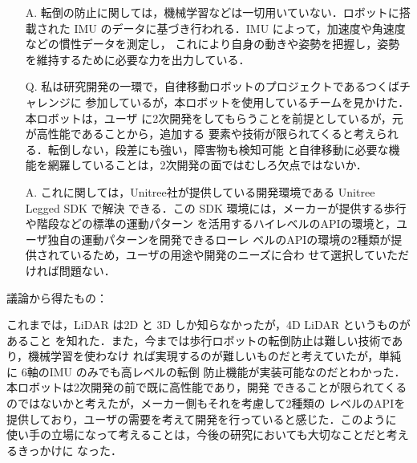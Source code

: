 \documentclass{jsarticle}
\begin{document}
\begin{itemize}
  \item [A.]転倒の防止に関しては，機械学習などは一切用いていない．ロボットに搭載された IMU
  \hspace*{5.5zw}のデータに基づき行われる．IMU によって，加速度や角速度などの慣性データを測定し，
  \hspace*{5.5zw}これにより自身の動きや姿勢を把握し，姿勢を維持するために必要な力を出力している．\\
  \vspace*{1zh}

  \item [Q.]私は研究開発の一環で，自律移動ロボットのプロジェクトであるつくばチャレンジに
  \hspace*{5.5zw}参加しているが，本ロボットを使用しているチームを見かけた．本ロボットは，ユーザ
  \hspace*{5.5zw}に2次開発をしてもらうことを前提としているが，元が高性能であることから，追加する
  \hspace*{5.5zw}要素や技術が限られてくると考えられる．転倒しない，段差にも強い，障害物も検知可能
  \hspace*{5.5zw}と自律移動に必要な機能を網羅していることは，2次開発の面ではむしろ欠点ではないか．
  
  \newpage

  \vspace*{-10zh}

  \item [A.]これに関しては，Unitree社が提供している開発環境である Unitree Legged SDK で解決
  \hspace*{5.5zw}できる．この SDK 環境には，メーカーが提供する歩行や階段などの標準の運動パターン
  \hspace*{5.5zw}を活用するハイレベルのAPIの環境と，ユーザ独自の運動パターンを開発できるローレ
  \hspace*{5.5zw}ベルのAPIの環境の2種類が提供されているため，ユーザの用途や開発のニーズに合わ
  \hspace*{5.5zw}せて選択していただければ問題ない．\\  
\end{itemize}

\hspace*{4.7zw}議論から得たもの：

\hspace*{5.7zw}これまでは，LiDAR は2D と 3D しか知らなかったが，4D LiDAR というものがあること
\hspace*{6.7zw}を知れた．また，今までは歩行ロボットの転倒防止は難しい技術であり，機械学習を使わなけ
\hspace*{6.7zw}れば実現するのが難しいものだと考えていたが，単純に 6軸のIMU のみでも高レベルの転倒
\hspace*{6.7zw}防止機能が実装可能なのだとわかった．本ロボットは2次開発の前で既に高性能であり，開発
\hspace*{6.7zw}できることが限られてくるのではないかと考えたが，メーカー側もそれを考慮して2種類の
\hspace*{6.7zw}レベルのAPIを提供しており，ユーザの需要を考えて開発を行っていると感じた．このように
\hspace*{6.7zw}使い手の立場になって考えることは，今後の研究においても大切なことだと考えるきっかけに
\hspace*{6.7zw}なった．
\end{document}
